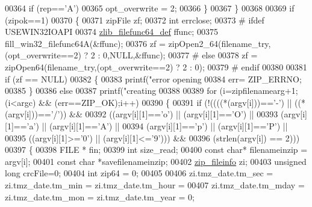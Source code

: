 \begin{DoxyCode}
{{{{{00364                 \textcolor{keywordflow}{if} (rep==\textcolor{charliteral}{'A'})
00365                     opt\_overwrite = 2;
00366             \}
00367     \}
00368 
00369     \textcolor{keywordflow}{if} (zipok==1)
00370     \{
00371         zipFile zf;
00372         \textcolor{keywordtype}{int} errclose;
00373 \textcolor{preprocessor}{#        ifdef USEWIN32IOAPI}
00374         \hyperlink{structzlib__filefunc64__def__s}{zlib\_filefunc64\_def} ffunc;
00375         fill\_win32\_filefunc64A(&ffunc);
00376         zf = zipOpen2\_64(filename\_try,(opt\_overwrite==2) ? 2 : 0,NULL,&ffunc);
00377 \textcolor{preprocessor}{#        else}
00378         zf = zipOpen64(filename\_try,(opt\_overwrite==2) ? 2 : 0);
00379 \textcolor{preprocessor}{#        endif}
00380 
00381         \textcolor{keywordflow}{if} (zf == NULL)
00382         \{
00383             printf(\textcolor{stringliteral}{"error opening %
00384             err= ZIP\_ERRNO;
00385         \}
00386         \textcolor{keywordflow}{else}
00387             printf(\textcolor{stringliteral}{"creating %
00388 
00389         \textcolor{keywordflow}{for} (i=zipfilenamearg+1;(i<argc) && (err==ZIP\_OK);i++)
00390         \{
00391             \textcolor{keywordflow}{if} (!((((*(argv[i]))==\textcolor{charliteral}{'-'}) || ((*(argv[i]))==\textcolor{charliteral}{'/'})) &&
00392                   ((argv[i][1]==\textcolor{charliteral}{'o'}) || (argv[i][1]==\textcolor{charliteral}{'O'}) ||
00393                    (argv[i][1]==\textcolor{charliteral}{'a'}) || (argv[i][1]==\textcolor{charliteral}{'A'}) ||
00394                    (argv[i][1]==\textcolor{charliteral}{'p'}) || (argv[i][1]==\textcolor{charliteral}{'P'}) ||
00395                    ((argv[i][1]>=\textcolor{charliteral}{'0'}) || (argv[i][1]<=\textcolor{charliteral}{'9'}))) &&
00396                   (strlen(argv[i]) == 2)))
00397             \{
00398                 FILE * fin;
00399                 \textcolor{keywordtype}{int} size\_read;
00400                 \textcolor{keyword}{const} \textcolor{keywordtype}{char}* filenameinzip = argv[i];
00401                 \textcolor{keyword}{const} \textcolor{keywordtype}{char} *savefilenameinzip;
00402                 \hyperlink{structzip__fileinfo}{zip\_fileinfo} zi;
00403                 \textcolor{keywordtype}{unsigned} \textcolor{keywordtype}{long} crcFile=0;
00404                 \textcolor{keywordtype}{int} zip64 = 0;
00405 
00406                 zi.tmz\_date.tm\_sec = zi.tmz\_date.tm\_min = zi.tmz\_date.tm\_hour =
00407                 zi.tmz\_date.tm\_mday = zi.tmz\_date.tm\_mon = zi.tmz\_date.tm\_year = 0;
}}}}}}}
\end{DoxyCode}
